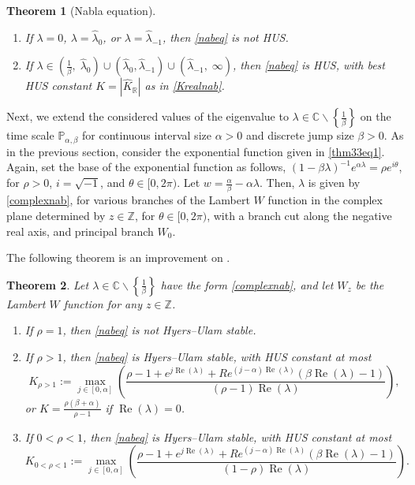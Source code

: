 \documentclass[12pt,reqno]{amsart}
\theoremstyle{plain}
\newtheorem{theorem}{Theorem}
\theoremstyle{definition}
\newcommand{\R}{\ensuremath{\mathbb{R}}}
\newcommand{\Z}{\ensuremath{\mathbb{Z}}}
\newcommand{\C}{\ensuremath{\mathbb{C}}}
\newcommand{\p}{\ensuremath{\mathbb{P}}}
\numberwithin{equation}{section}
\numberwithin{theorem}{section}
\begin{document}
\begin{theorem}[Nabla equation]
\begin{enumerate}
\begin{enumerate}
\item If $\lambda=0$, $\lambda=\widehat{\lambda}_{0}$, or $\lambda=\widehat{\lambda}_{-1}$, then \eqref{nabeq} is not HUS.
\item If $\lambda\in\left(\frac{1}{\beta},\; \widehat{\lambda}_{0}\right)\cup\left(\widehat{\lambda}_{0},\widehat{\lambda}_{-1}\right)\cup\left(\widehat{\lambda}_{-1},\; \infty\right)$, then \eqref{nabeq} is HUS, with best HUS constant $K=\left|\widehat{K}_{\R}\right|$ as in \eqref{Krealnab}.
\end{enumerate}
\end{enumerate}
\end{theorem}

Next, we extend the considered values of the eigenvalue to $\lambda\in\C\backslash\left\{\frac{1}{\beta}\right\}$ on the time scale $\p_{\alpha,\beta}$ for continuous interval size $\alpha>0$ and discrete jump size $\beta>0$. As in the previous section, consider the exponential function given in 
\eqref{thm33eq1}. Again, set the base of the exponential function as follows, $(1-\beta\lambda)^{-1}e^{\alpha\lambda}=\rho e^{i\theta}$, for $\rho>0$, $i=\sqrt{-1}$, and $\theta\in[0,2\pi)$. Let $w=\frac{\alpha}{\beta}-\alpha\lambda$. Then, $\lambda$ is given by \eqref{complexnab}, for various branches of the Lambert $W$ function in the complex plane determined by $z\in\Z$, for $\theta\in[0,2\pi)$, with a branch cut along the negative real axis, and principal branch $W_0$. 

The following theorem is an improvement on \cite[Theorem 3.6]{and}.


\begin{theorem}\label{complexTHMHUS}
Let $\lambda\in\C\backslash\left\{\frac{1}{\beta}\right\}$ have the form \eqref{complexnab}, and let $W_z$ be the Lambert $W$ function for any $z\in\Z$. 
\begin{enumerate}
\item If $\rho=1$, then \eqref{nabeq} is not Hyers--Ulam stable.
\item If $\rho>1$, then \eqref{nabeq} is Hyers--Ulam stable, with HUS constant at most 
\begin{equation}\label{KRbigger1}
 K_{\rho>1}:=\max_{j\in[0,\alpha]}\left(\frac{\rho-1+e^{j\operatorname{Re}(\lambda)}+Re^{(j-\alpha)\operatorname{Re}(\lambda)}\left(\beta\operatorname{Re}(\lambda)-1\right)}{(\rho-1)\operatorname{Re}(\lambda)}\right), 
\end{equation} 
or $K=\frac{\rho(\beta+\alpha)}{\rho-1}$ if $\operatorname{Re}(\lambda)=0$. 
\item If $0<\rho<1$, then \eqref{nabeq} is Hyers--Ulam stable, with HUS constant at most  
\begin{equation}\label{Krsmaller1}
 K_{0<\rho<1}:= \max_{j\in[0,\alpha]}\left(\frac{\rho-1+e^{j\operatorname{Re}(\lambda)}+Re^{(j-\alpha)\operatorname{Re}(\lambda)}\left(\beta\operatorname{Re}(\lambda)-1\right)}{(1-\rho)\operatorname{Re}(\lambda)}\right). 
\end{equation}
\end{enumerate}
\end{theorem}
\end{document}
